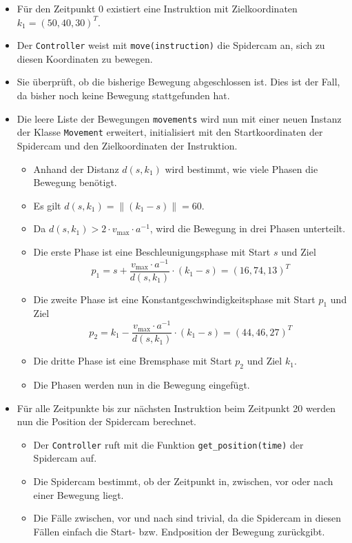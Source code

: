 \begin{itemize}
    \item Für den Zeitpunkt $0$ existiert eine Instruktion mit Zielkoordinaten $k_1 = (50, 40, 30)^T$.
    \item Der \texttt{Controller} weist mit \texttt{move(instruction)} die Spidercam an, sich zu diesen Koordinaten zu bewegen.
    \item Sie überprüft, ob die bisherige Bewegung abgeschlossen ist. Dies ist der Fall, da bisher noch keine Bewegung stattgefunden hat.
    \item Die leere Liste der Bewegungen \texttt{movements} wird nun mit einer neuen Instanz der Klasse \texttt{Movement} erweitert, initialisiert mit den Startkoordinaten der Spidercam und den Zielkoordinaten der Instruktion.
          \begin{itemize}
              \item Anhand der Distanz $d(s, k_1)$ wird bestimmt, wie viele Phasen die Bewegung benötigt.
              \item Es gilt $d(s, k_1) = \|(k_1 - s)\| = 60$.
              \item Da $d(s, k_1) > 2 \cdot v_{\max} \cdot a^{-1}$, wird die Bewegung in drei Phasen unterteilt.
              \item Die erste Phase ist eine Beschleunigungsphase mit Start $s$ und Ziel
                    \[ p_1 = s + \frac{v_{\max} \cdot a^{-1}}{d(s, k_1)} \cdot (k_1 - s) = (16, 74, 13)^T \]
              \item Die zweite Phase ist eine Konstantgeschwindigkeitsphase mit Start $p_1$ und Ziel
                    \[ p_2 = k_1 - \frac{v_{\max} \cdot a^{-1}}{d(s, k_1)} \cdot (k_1 - s) = (44, 46, 27)^T \]
              \item Die dritte Phase ist eine Bremsphase mit Start $p_2$ und Ziel $k_1$.
              \item Die Phasen werden nun in die Bewegung eingefügt.
          \end{itemize}
    \item Für alle Zeitpunkte bis zur nächsten Instruktion beim Zeitpunkt 20 werden nun die Position der Spidercam berechnet.
          \begin{itemize}
              \item Der \texttt{Controller} ruft mit die Funktion \texttt{get\_position(time)} der Spidercam auf.
              \item Die Spidercam bestimmt, ob der Zeitpunkt in, zwischen, vor oder nach einer Bewegung liegt.
              \item Die Fälle zwischen, vor und nach sind trivial, da die Spidercam in diesen Fällen einfach die Start- bzw. Endposition der Bewegung zurückgibt.

\end{itemize}
\end{itemize}
